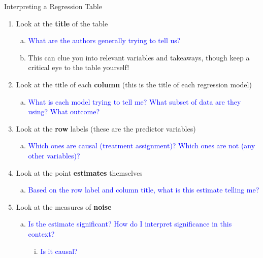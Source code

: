 \documentclass[
  11pt,
  ignorenonframetext,
]{beamer}
\providecommand{\tightlist}{%
  \setlength{\itemsep}{0pt}\setlength{\parskip}{0pt}}
\begin{document}
\begin{frame}{Interpreting a Regression Table}
\protect{}\label{interpreting-a-regression-table}
\small

\begin{enumerate}
\tightlist
\item
  Look at the \textbf{title} of the table \pause

  \begin{enumerate}
  [a.]
  \tightlist
  \item
    \textcolor{blue}{What are the authors generally trying to tell us?}
  \item
    This can clue you into relevant variables and takeaways, though keep
    a critical eye to the table yourself! \pause
  \end{enumerate}
\item
  Look at the title of each \textbf{column} (this is the title of each
  regression model) \pause

  \begin{enumerate}
  [a.]
  \tightlist
  \item
    \textcolor{blue}{What is each model trying to tell me? What subset of data are they using? What outcome?}
    \pause
  \end{enumerate}
\item
  Look at the \textbf{row} labels (these are the predictor variables)
  \pause

  \begin{enumerate}
  [a.]
  \tightlist
  \item
    \textcolor{blue}{Which ones are causal (treatment assignment)? Which ones are not (any other variables)?}
    \pause
  \end{enumerate}
\item
  Look at the point \textbf{estimates} themselves \pause

  \begin{enumerate}
  [a.]
  \tightlist
  \item
    \textcolor{blue}{Based on the row label and column title, what is this estimate telling me?}
    \pause
  \end{enumerate}
\item
  Look at the measures of \textbf{noise} \pause

  \begin{enumerate}
  [a.]
  \tightlist
  \item
    \textcolor{blue}{Is the estimate significant? How do I interpret significance in this context?}

    \begin{enumerate}
    [i.]
    \tightlist
    \item
      \textcolor{blue}{Is it causal?}
    \end{enumerate}
  \end{enumerate}
\end{enumerate}

\normalsize
\end{frame}
\end{document}
